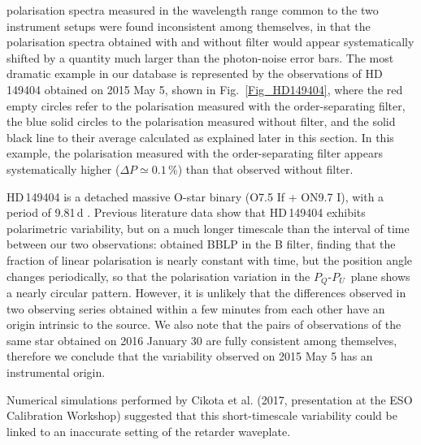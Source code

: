 \documentclass[a4paper]{aa}
\newcommand{\pq}{\ensuremath{P_Q}}
\newcommand{\pu}{\ensuremath{P_U}}
\begin{document}
polarisation spectra measured in the wavelength range common to the
two instrument setups were found inconsistent among themselves, in that
the polarisation spectra obtained with and without filter would appear
systematically shifted by a quantity much larger than the photon-noise error
bars. The most dramatic example in our database is represented by the
observations of HD\,149404 obtained on 2015 May 5, shown in
Fig.~\ref{Fig_HD149404}, where the red empty circles refer to the
polarisation measured with the order-separating filter, the blue solid
circles to the polarisation measured without filter, and the solid black
line to their average calculated as explained later in this section. In
this example, the polarisation measured with the order-separating
filter appears systematically higher ($\Delta P \simeq 0.1$\,\%) than
that observed without filter.

HD\,149404 is a detached massive O-star binary (O7.5 If + ON9.7 I),
with a period of 9.81\,d \citep{MasCon79}. Previous literature data
show that HD\,149404 exhibits polarimetric variability, but on a much
longer timescale than the interval of time between our two
observations: \cite{Luna88} obtained BBLP in the B filter, finding that
the fraction of linear polarisation is nearly constant with time, but
the position angle changes periodically, so that the polarisation
variation in the \pq-\pu\ plane shows a nearly circular
pattern. However, it is unlikely that the differences observed in two
observing series obtained within a few minutes from each other have an
origin intrinsic to the source. We also note that the pairs of
observations of the same star obtained on 2016 January 30 are fully
consistent among themselves, therefore we conclude that the
variability observed on 2015 May 5 has an instrumental origin.

Numerical simulations performed by Cikota et al. (2017, presentation
at the ESO Calibration Workshop) suggested that this short-timescale
variability could be linked to an inaccurate setting of the
retarder waveplate.
\end{document}
